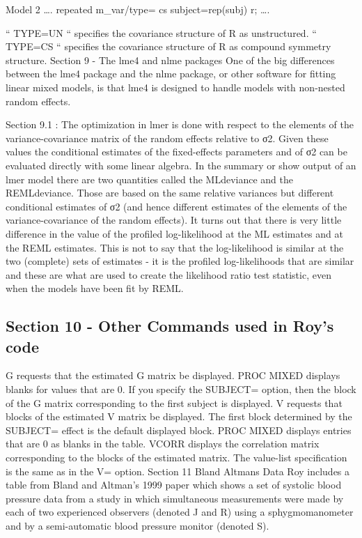 Model 2
….
repeated m_var/type= cs subject=rep(subj) r;
….

“ TYPE=UN “ specifies the covariance structure of R as unstructured.
“ TYPE=CS “ specifies the covariance structure of R as compound symmetry structure.
Section 9 - The lme4 and nlme packages
One of the big differences between the lme4 package and the nlme package, or other software for fitting linear mixed models, is that lme4 is designed to handle models with non-nested random effects.

Section 9.1 : The optimization in lmer is done with respect to the elements of the variance-covariance matrix of the random effects relative to σ2. Given these values the conditional estimates of the fixed-effects parameters and of σ2 can be evaluated directly with some linear algebra. In the summary or show output of an lmer model there are two quantities called the MLdeviance and the REMLdeviance. 
Those are based on the same relative variances but different conditional estimates of σ2 (and hence different estimates of the elements of the variance-covariance of the random effects). It turns out that there is very little difference in the value of the profiled log-likelihood at the ML estimates and at the REML estimates. 
This is not to say that the log-likelihood is similar at the two (complete) sets of estimates - it is the profiled log-likelihoods that are similar and these are what are used to create the likelihood ratio test statistic, even when the models have been fit by REML.

\subsection*{Section 10 - Other Commands used in Roy’s code}

G requests that the estimated G matrix be displayed. PROC MIXED displays blanks for values that are 0. 
If you specify the SUBJECT= option, then the block of the  G matrix corresponding to the first subject is displayed. 
V requests that blocks of the estimated V matrix be displayed. The first block determined by the SUBJECT= effect is the default displayed block. PROC MIXED displays entries that are 0 as blanks in the table. 
VCORR displays the correlation matrix corresponding to the blocks of the estimated  matrix. 
The value-list specification is the same as in the V= option. 
Section 11 Bland Altmans Data
Roy includes a table from Bland and Altman’s 1999 paper which shows a set of systolic blood pressure data from a study in which simultaneous measurements were made by each of two experienced observers (denoted J and R) using a sphygmomanometer and by a semi-automatic blood pressure monitor (denoted S).


